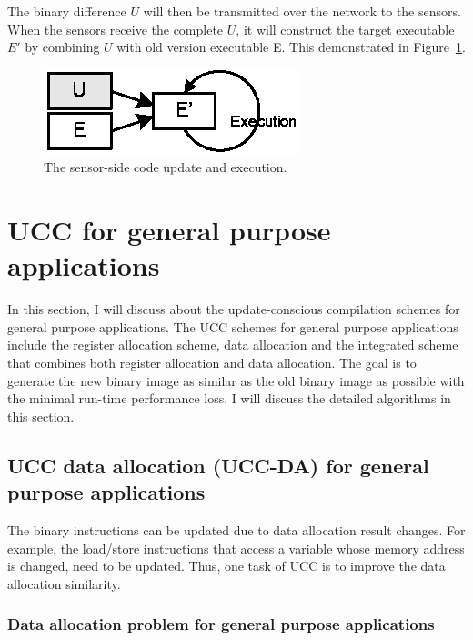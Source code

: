 The binary difference $U$ will then be transmitted over the network to the sensors. When the sensors receive the complete $U$, it will construct the target executable $E'$ by combining $U$ with old version executable {E}. This demonstrated in Figure~\ref{fover.sensor}.

\begin{figure}[htp]
\centering
\includegraphics[scale=1]{figures/com_sensor.eps}
\caption{The sensor-side code update and execution.}
\label{fover.sensor}
\end{figure}

\section{UCC for general purpose applications}

In this section, I will discuss about the update-conscious compilation schemes for general purpose applications.
The UCC schemes for general purpose applications include the register allocation scheme, data allocation and
the integrated scheme that combines both register allocation and data allocation.
The goal is to generate the new binary image as similar as the old binary image as possible with the minimal
run-time performance loss. I will discuss the detailed algorithms in this section.


\subsection{UCC data allocation (UCC-DA) for general purpose applications} 

The binary instructions can be updated due to data allocation result changes.
For example, the load/store instructions that access a variable whose memory address is changed,
need to be updated.
Thus, one task of UCC is to improve the data allocation similarity.


\subsubsection{Data allocation problem for general purpose applications}

